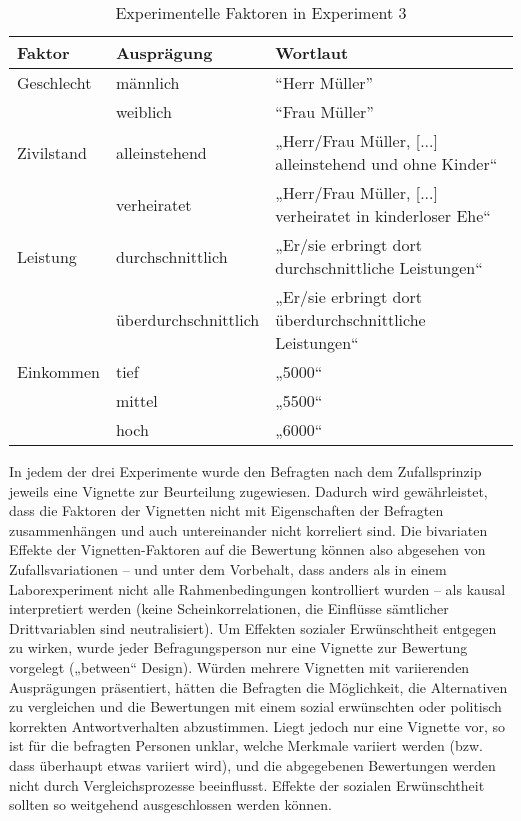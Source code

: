 \documentclass[a4paper,12pt]{article}
\begin{document}
\begin{table}
    \small
    \caption{Experimentelle Faktoren in Experiment 3}\label{tab-ex3-faktoren}
    \begin{tabularx}{\textwidth}{@{}llX@{}}
        \toprule
        Faktor          & Ausprägung & Wortlaut       \\\midrule
        Geschlecht      & männlich     & “Herr Müller”   \\
                        & weiblich     & “Frau Müller”   \\
        \addlinespace
        Zivilstand   & alleinstehend         & „Herr/Frau Müller, [...] alleinstehend und ohne Kinder“ \\
                        & verheiratet         & „Herr/Frau Müller, [...] verheiratet in kinderloser Ehe“ \\
        \addlinespace
        Leistung        & durchschnittlich         & „Er/sie erbringt dort durchschnittliche Leistungen“   \\
                        & überdurchschnittlich         & „Er/sie erbringt dort überdurchschnittliche Leistungen“  \\
	  \addlinespace
        Einkommen        & tief         & „5000“   \\
					& mittel & „5500“   \\
					& hoch & „6000“   \\
        \bottomrule
    \end{tabularx}
\end{table}

In jedem der drei Experimente wurde den Befragten nach dem Zufallsprinzip jeweils eine Vignette
zur Beurteilung zugewiesen. Dadurch wird gewährleistet, dass die
Faktoren der Vignetten nicht mit Eigenschaften der Befragten zusammenhängen und
auch untereinander nicht korreliert sind. Die bivariaten Effekte der
Vignetten-Faktoren auf die Bewertung können also abgesehen von
Zufallsvariationen – und unter dem Vorbehalt, dass anders als in einem
Laborexperiment nicht alle Rahmenbedingungen kontrolliert wurden – als
kausal interpretiert werden (keine Scheinkorrelationen, die Einflüsse
sämtlicher Drittvariablen sind neutralisiert). 
Um Effekten sozialer Erwünschtheit entgegen zu wirken, wurde jeder
Befragungsperson nur eine Vignette zur Bewertung vorgelegt („between“ Design).
Würden mehrere Vignetten mit variierenden Ausprägungen präsentiert, hätten die
Befragten die Möglichkeit, die Alternativen zu vergleichen und die Bewertungen
mit einem sozial erwünschten oder politisch korrekten Antwortverhalten
abzustimmen. Liegt jedoch nur eine Vignette vor, so ist für die befragten
Personen unklar, welche Merkmale variiert werden (bzw. dass überhaupt etwas
variiert wird), und die abgegebenen Bewertungen werden nicht durch
Vergleichsprozesse beeinflusst. Effekte der sozialen Erwünschtheit sollten so
weitgehend ausgeschlossen werden können. \\
\end{document}
